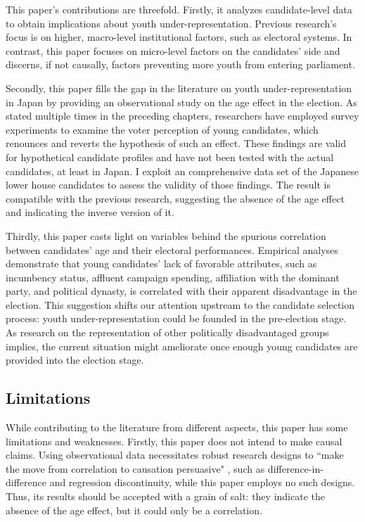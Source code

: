 \documentclass[a4paper, 12pt]{article}\usepackage[dvipdfmx]{graphicx}\usepackage[]{xcolor}
\begin{document}
This paper's contributions are threefold. Firstly, it analyzes candidate-level data to obtain implications about youth under-representation. Previous research's focus is on higher, macro-level institutional factors, such as electoral systems. In contrast, this paper focuses on micro-level factors on the candidates' side and discerns, if not causally, factors preventing more youth from entering parliament. 

Secondly, this paper fills the gap in the literature on youth under-representation in Japan by providing an observational study on the age effect in the election. As stated multiple times in the preceding chapters, researchers have employed survey experiments to examine the voter perception of young candidates, which renounces and reverts the hypothesis of such an effect. These findings are valid for hypothetical candidate profiles and have not been tested with the actual candidates, at least in Japan. I exploit an comprehensive data set of the Japanese lower house candidates to assess the validity of those findings. The result is compatible with the previous research, suggesting the absence of the age effect and indicating the inverse version of it. 

Thirdly, this paper casts light on variables behind the spurious correlation between candidates' age and their electoral performances. Empirical analyses demonstrate that young candidates' lack of favorable attributes, such as incumbency status, affluent campaign spending, affiliation with the dominant party, and political dynasty, is correlated with their apparent disadvantage in the election. This suggestion shifts our attention upstream to the candidate selection process: youth under-representation could be founded in the pre-election stage. As research on the representation of other politically disadvantaged groups implies, the current situation might ameliorate once enough young candidates are provided into the election stage. 

\subsection{Limitations} \label{ch6.3}

While contributing to the literature from different aspects, this paper has some limitations and weaknesses. Firstly, this paper does not intend to make causal claims. Using observational data necessitates robust research designs to ``make the move from correlation to causation persuasive" \citep{sekhon2009opiates}, such as difference-in-difference and regression discontinuity, while this paper employs no such designs. Thus, its results should be accepted with a grain of salt: they indicate the absence of the age effect, but it could only be a correlation. 
\end{document}
